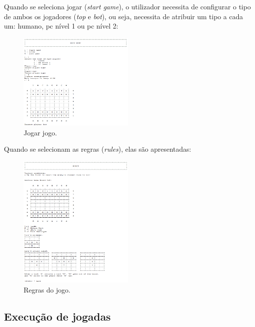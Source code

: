 \documentclass[a4paper,11pt,portuguese]{article}
\begin{document}
    \noindent Quando se seleciona jogar (\textit{start game}), o utilizador necessita de configurar
    o tipo de ambos os jogadores (\textit{top} e \textit{bot}), ou seja, necessita de atribuir um tipo a cada um:
    humano, pc nível 1 ou pc nível 2:

    \begin{figure}[H]
        \centering
        \includegraphics[width=0.5\textwidth]{imgs/start_game.png}
        \caption{Jogar jogo.}
        \label{fig:start_game}
    \end{figure}


    \noindent Quando se selecionam as regras (\textit{rules}), elas são apresentadas:

    \begin{figure}[H]
        \centering
        \includegraphics[width=0.5\textwidth]{imgs/rules.png}
        \caption{Regras do jogo.}
        \label{fig:game_rules}
    \end{figure}


    \subsection{Execução de jogadas}
\end{document}
